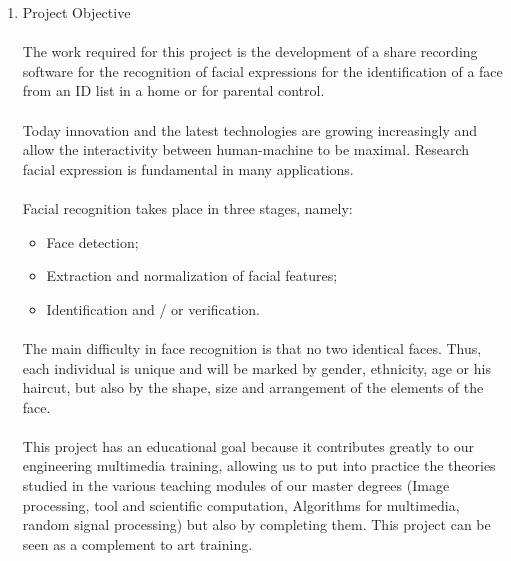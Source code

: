 \begin{enumerate}
	\item Project Objective \paragraph{}
The work required for this project is the development of a share recording software for the recognition of facial expressions for the identification of a face from an ID list in a home or for parental control.\paragraph{}
Today innovation and the latest technologies are growing increasingly and allow the interactivity between human-machine to be maximal. Research facial expression is fundamental in many applications.\paragraph{}
Facial recognition takes place in three stages, namely:
\begin{itemize}
	\item Face detection;
	\item Extraction and normalization of facial features;
	\item Identification and / or verification.\paragraph{}
\end{itemize}    

The main difficulty in face recognition is that no two identical faces. Thus, each individual is unique and will be marked by gender, ethnicity, age or his haircut, but also by the shape, size and arrangement of the elements of the face.\paragraph{}

This project has an educational goal because it contributes greatly to our engineering multimedia training, allowing us to put into practice the theories studied in the various teaching modules of our master degrees (Image processing, tool and scientific computation, Algorithms for multimedia, random signal processing) but also by completing them. This project can be seen as a complement to art training.\vspace{0.5cm}

\end{enumerate}

